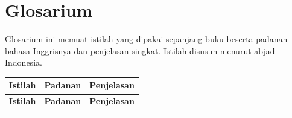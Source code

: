 \chapter{Glosarium}
\label{app:glosarium}

Glosarium ini memuat istilah yang dipakai sepanjang buku beserta
padanan bahasa Inggrisnya dan penjelasan singkat. Istilah disusun
menurut abjad Indonesia.

\begingroup
\footnotesize
\begin{longtable}{@{}p{3.4cm}p{3.4cm}p{6.6cm}@{}}
\toprule
\textbf{Istilah} & \textbf{Padanan} & \textbf{Penjelasan} \\
\midrule
\endfirsthead
\toprule
\textbf{Istilah} & \textbf{Padanan} & \textbf{Penjelasan} \\
\midrule
\endhead
\bottomrule
\endfoot


\end{longtable}
